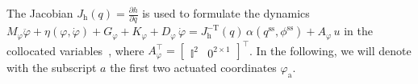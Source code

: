 The Jacobian $J_\mathrm{h}(q) = \frac{\partial h}{\partial q}$ is used to formulate the dynamics $M_\varphi \ddot{\varphi} + \eta(\varphi, \dot{\varphi}) + G_\varphi + K_\varphi + D_\varphi \, \dot{\varphi} = J_\mathrm{h}^\mathrm{-T}(q) \, \alpha(q^\mathrm{ss},\phi^\mathrm{ss}) + A_\varphi \, u $ in the collocated variables~\citep{khatib1987unified}, where $A_\varphi^\top = \begin{bmatrix}
    \mathbb{I}^{2} & 0^\mathrm{2 \times 1}
\end{bmatrix}^\top$. In the following, we will denote with the subscript $a$ the first two actuated coordinates $\varphi_\mathrm{a}$.
